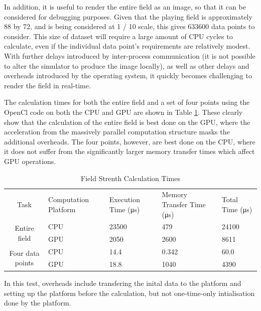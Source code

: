 \documentclass[10pt]{article}
\begin{document}
In addition, it is useful to render the entire field as an image, so that it can
be considered for debugging purposes. Given that the playing field is
approximately \SI{88}{\inch} by \SI{72}{\inch}, and is being considered at
\SI[quotient-mode = fraction]{1 / 10}{\inch} scale, this gives \num{633600} data
points to consider. This size of dataset will require a large amount of CPU
cycles to calculate, even if the individual data point's requirements are
relatively modest. With further delays introduced by inter-process communication
(it is not possible to alter the simulator to produce the image locally), as
well as other delays and overheads introduced by the operating system, it
quickly becomes challenging to render the field in real-time.

The calculation times for both the entire field and a set of four points using
the OpenCl code on both the CPU and GPU are shown in Table
\ref{tab:Field-Strenth-Calculation}. These clearly show that the calculation of
the entire field is best done on the GPU, where the acceleration from the
massively parallel computation structure masks the additional overheads. The
four points, however, are best done on the CPU, where it does not suffer from
the significantly larger memory transfer times which affect GPU operations.

\begin{singlespace}
\begin{table}
\centering%
\begin{tabular}{|c|m{2cm}|p{2cm}|p{3cm}|m{2cm}|}
\hline
\multirow{2}{*}{Task} & \multirow{2}{3cm}{Computation Platform} &
\multirow{2}{2cm}{Execution Time (\si{\micro\second})} &
\multirow{2}{3cm}{Memory Transfer Time (\si{\micro\second})} &
\multirow{2}{1.8cm}{Total Time (\si{\micro\second})} \\
 &  &  &  & \\
\hline
\multirow{2}{*}{Entire field} & CPU & \num{23500} & \num{479} & \num{24100}
\\
\cline{2-5}
 & GPU & \num{2050} & \num{2600} & \num{8611} \\
\hline
\multirow{2}{*}{Four data points} & CPU & \num{14.4} & \num{0.342} &
\num{60.0}
\\
\cline{2-5}
 & GPU & \num{18.8} & \num{1040} & \num{4390} \\
\hline
\end{tabular}

In this test, overheads include transfering the inital data to the platform and
setting up the platform before the calculation, but not one-time-only
intialisation done by the platform.

\caption{Field Strenth Calculation Times\label{tab:Field-Strenth-Calculation}}
\end{table}

\end{singlespace}
\end{document}
